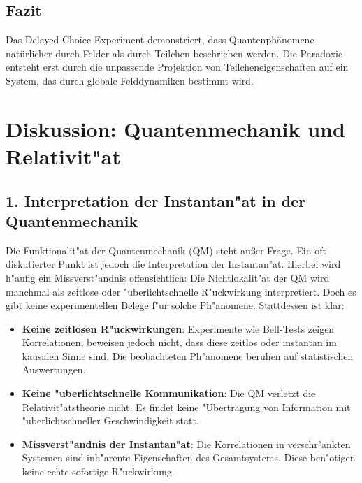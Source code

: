 \documentclass[12pt,a4paper]{article}
\begin{document}
\subsection{Fazit}
Das Delayed-Choice-Experiment demonstriert, dass Quantenphänomene natürlicher durch Felder als durch Teilchen beschrieben werden. Die Paradoxie entsteht erst durch die unpassende Projektion von Teilcheneigenschaften auf ein System, das durch globale Felddynamiken bestimmt wird.
	\section*{Diskussion: Quantenmechanik und Relativit"at}

\subsection*{1. Interpretation der Instantan"at in der Quantenmechanik}
Die Funktionalit"at der Quantenmechanik (QM) steht au\ss er Frage. Ein oft diskutierter Punkt ist jedoch die Interpretation der Instantan"at. Hierbei wird h"aufig ein Missverst"andnis offensichtlich: Die Nichtlokalit"at der QM wird manchmal als zeitlose oder "uberlichtschnelle R"uckwirkung interpretiert. Doch es gibt keine experimentellen Belege f"ur solche Ph"anomene. Stattdessen ist klar:
\begin{itemize}
	\item \textbf{Keine zeitlosen R"uckwirkungen}: Experimente wie Bell-Tests zeigen Korrelationen, beweisen jedoch nicht, dass diese zeitlos oder instantan im kausalen Sinne sind. Die beobachteten Ph"anomene beruhen auf statistischen Auswertungen.
	\item \textbf{Keine "uberlichtschnelle Kommunikation}: Die QM verletzt die Relativit"atstheorie nicht. Es findet keine "Ubertragung von Information mit "uberlichtschneller Geschwindigkeit statt.
	\item \textbf{Missverst"andnis der Instantan"at}: Die Korrelationen in verschr"ankten Systemen sind inh"arente Eigenschaften des Gesamtsystems. Diese ben"otigen keine echte \glqq sofortige\grqq{} R"uckwirkung.
\end{itemize}
\end{document}
